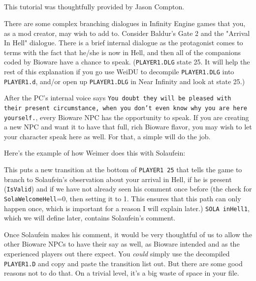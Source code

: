 \documentclass{article}
\def\ttref#1{\ahrefloc{#1}{\tt #1}}
\def\t#1{{\tt #1}}
\begin{document}
\subsection{\ttref{COPY_TRANS}}

This tutorial was thoughtfully provided by Jason Compton.

There are some complex branching dialogues in Infinity Engine games that
you, as a mod creator, may wish to add to. Consider Baldur's Gate 2 and the
"Arrival In Hell" dialogue. There is a brief internal dialogue as the
protagonist comes to terms with the fact that he/she is now in Hell, and
then all of the companions coded by Bioware have a chance to speak.
(\t{PLAYER1.DLG} state 25. It will help the rest of this explanation if you
go use WeiDU to decompile \t{PLAYER1.DLG} into \t{PLAYER1.d}, and/or open
up \t{PLAYER1.DLG} in Near Infinity and look at state 25.)

After the PC's internal voice says \t{You doubt they will be pleased with
their present circumstance, when you don't even know why you are here
yourself.}, every Bioware NPC has the opportunity to speak. If you are
creating a new NPC and want it to have that full, rich Bioware flavor, you
may wish to let your character speak here as well. For that, a simple
\ttref{EXTEND_BOTTOM} will do the job.

Here's the example of how Weimer does this with Solaufein:
This puts a new transition at the bottom of \t{PLAYER1 25} that tells the
game to branch to Solaufein's observation about your arrival in Hell, if he
is present (\t{IsValid}) and if we have not already seen his comment once
before (the check for \t{SolaWelcomeHell}=0, then setting it to 1. This
ensures that this path can only happen once, which is important for a
reason I will explain later.) \t{SOLA inHell1}, which we will define later,
contains Solaufein's comment.

Once Solaufein makes his comment, it would be very thoughtful of us to
allow the other Bioware NPCs to have their say as well, as Bioware intended
and as the experienced players out there expect. You {\em could} simply use the
decompiled \t{PLAYER1.D} and copy and paste the transition list out. But
there are some good reasons not to do that. On a trivial level, it's a big
waste of space in your \ttref{D} file.
\end{document}
